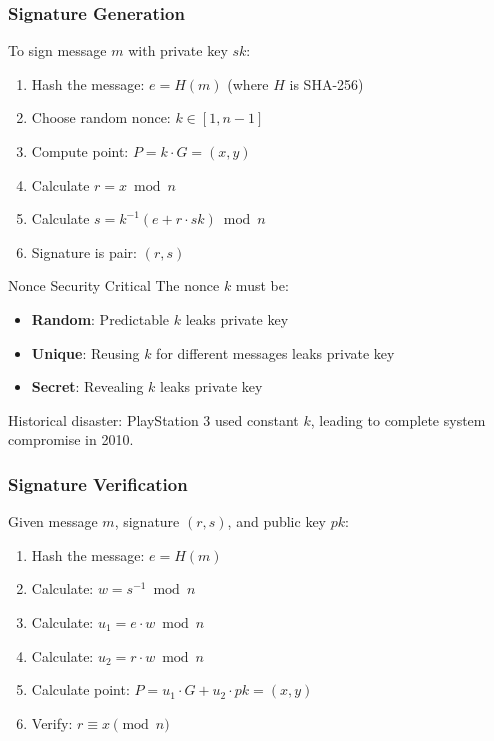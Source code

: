 \documentclass[11pt,a4paper]{article}
\begin{document}
\subsubsection{Signature Generation}

To sign message $m$ with private key $sk$:

\begin{enumerate}
  \item Hash the message: $e = H(m)$ (where $H$ is SHA-256)
  \item Choose random nonce: $k \in [1, n-1]$
  \item Compute point: $P = k \cdot G = (x, y)$
  \item Calculate $r = x \bmod n$
  \item Calculate $s = k^{-1}(e + r \cdot sk) \bmod n$
  \item Signature is pair: $(r, s)$
\end{enumerate}

\begin{securitybox}{Nonce Security Critical}
The nonce $k$ must be:
\begin{itemize}
  \item \textbf{Random}: Predictable $k$ leaks private key
  \item \textbf{Unique}: Reusing $k$ for different messages leaks private key
  \item \textbf{Secret}: Revealing $k$ leaks private key
\end{itemize}

Historical disaster: PlayStation 3 used constant $k$, leading to complete system compromise in 2010.
\end{securitybox}

\subsubsection{Signature Verification}

Given message $m$, signature $(r, s)$, and public key $pk$:

\begin{enumerate}
  \item Hash the message: $e = H(m)$
  \item Calculate: $w = s^{-1} \bmod n$
  \item Calculate: $u_1 = e \cdot w \bmod n$
  \item Calculate: $u_2 = r \cdot w \bmod n$
  \item Calculate point: $P = u_1 \cdot G + u_2 \cdot pk = (x, y)$
  \item Verify: $r \equiv x \pmod{n}$
\end{enumerate}
\end{document}
